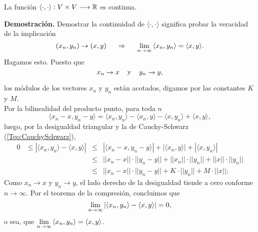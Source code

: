 \begin{prop} \label{prop: continuidad del producto punto}
La función $\langle  \cdot , \cdot \rangle :
V \times V \longrightarrow \mathbb{R} $ es continua.
\end{prop}
\noindent
\textbf{Demostración.}
Demostrar la continuidad de 
$\langle  \cdot , \cdot \rangle$ significa 
probar la veracidad de la implicación
\[
(x_{n}, y_{n}) \rightarrow (x,y) \hspace{0.5cm}
\Rightarrow \hspace{0.5cm} \lim\limits_{n \rightarrow \infty}{
\langle  x_{n} , y_{n} \rangle} = \langle  x , y \rangle .
\]
Hagamos esto. Puesto que
\[
x_{n} \rightarrow x \hspace{0.4cm} \text{y}
\hspace{0.4cm} y_{n} \rightarrow y, 
\]

\noindent
los módulos de los vectores $x_{n}$ y $y_{n}$ 
están acotados, digamos por las constantes $K$ y $M$. \\
Por la bilinealidad del producto punto, para toda $n$
\[
\langle x_{n}-x , y_{n}-y \rangle =
\langle x_{n}, y_{n}\rangle -
\langle x_{n} , y \rangle -
\langle x , y_{n} \rangle +
\langle x , y \rangle ,
\]
\noindent
luego, por la desigualdad triangular y la de Cauchy-Schwarz
(\ref{Teo:CauchySchwarz}),
\begin{align*}
0 & \leq |\langle x_{n}, y_{n}\rangle - \langle x , y \rangle|
& \leq & |\langle x_{n}-x , y_{n}-y \rangle| +
|\langle x_{n} , y \rangle| + |\langle x , y_{n} \rangle| \\
&& \leq & ||x_{n}-x|| \cdot ||y_{n}-y|| + ||x_{n}||\cdot ||y_{n}||
+||x|| \cdot ||y_{n}|| \\
&& \leq & ||x_{n}-x|| \cdot ||y_{n}-y|| + K\cdot ||y_{n}||
+M \cdot ||x||; 
\end{align*}
Como $x_{n} \rightarrow x$ y $y_{n} \rightarrow y$,
el lado derecho de la desigualdad tiende a cero
conforme $n \rightarrow \infty$. Por el teorema de la compresión,
concluimos que
\[
\lim\limits_{n \rightarrow \infty}{|\langle x_{n}, y_{n}\rangle - \langle x , y \rangle|}=0,
\]
o sea, que 
$ \lim\limits_{n \rightarrow \infty}{
\langle  x_{n} , y_{n} \rangle} = \langle  x , y \rangle$.
\QEDB
\vspace{0.2cm}


